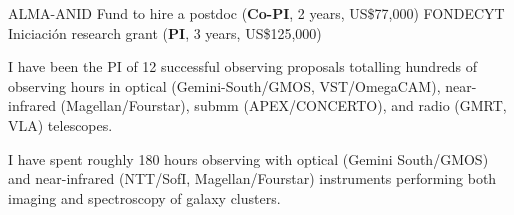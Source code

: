 \documentclass[11pt]{article}
\begin{document}

\hline

\pagebreak


\noindent
{} ALMA-ANID Fund to hire a postdoc (\textbf{Co-PI}, 2 years, US\$77,000)
 FONDECYT Iniciaci\'on research grant (\textbf{PI}, 3 years, US\$125,000)



%

\noindent
I have been the PI of 12 successful observing proposals totalling hundreds of 
observing hours in optical (Gemini-South/GMOS, VST/OmegaCAM), near-infrared 
(Magellan/Fourstar), submm (APEX/CONCERTO), and radio (GMRT, VLA) telescopes.

{I have spent roughly 180 hours observing with 
optical (Gemini South/GMOS) and near-infrared (NTT/SofI, Magellan/Fourstar) instruments performing both 
imaging and spectroscopy of galaxy clusters.}
\end{document}
